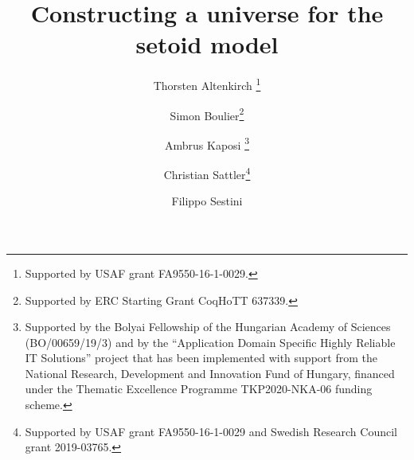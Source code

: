 \documentclass[autoref]{llncs}
\begin{document}
\title{Constructing a universe for the setoid model}


\author{Thorsten Altenkirch
  \thanks{Supported by USAF grant FA9550-16-1-0029.}
  \Letter \and
  Simon Boulier\thanks{Supported by ERC Starting Grant CoqHoTT 637339.} \and
  Ambrus Kaposi
  \thanks{Supported by the Bolyai Fellowship of the Hungarian Academy
    of Sciences (BO/00659/19/3) and by the ``Application Domain
    Specific Highly Reliable IT Solutions'' project that has been
    implemented with support from the National Research, Development
    and Innovation Fund of Hungary, financed under the Thematic
    Excellence Programme TKP2020-NKA-06 funding scheme.}\and
  Christian Sattler\thanks{Supported by USAF grant FA9550-16-1-0029 and Swedish Research Council grant 2019-03765.} \and
  Filippo Sestini}


\end{document}
